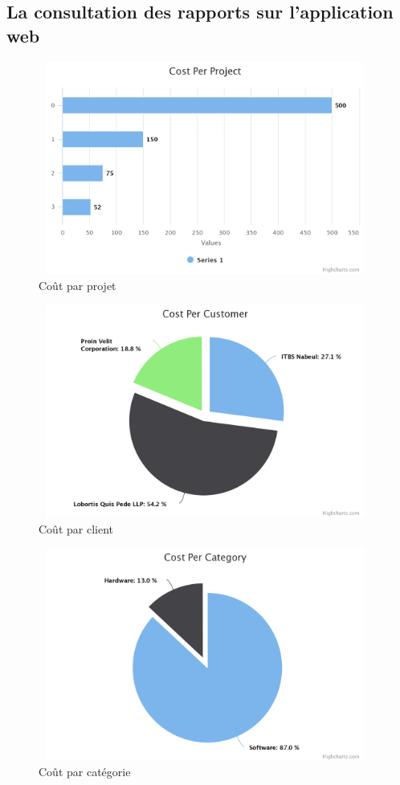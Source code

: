 \subsection{La consultation des rapports  sur l'application web}

\begin{figure}[H]
\center
\includegraphics[width=11cm,height=7cm]{./figures/pres/cost-per-project.png}
\caption{ Co\^{u}t par projet }
\end{figure}



\begin{figure}[H]
\center
\includegraphics[width=11cm,height=7cm]{./figures/pres/cost-per-customer.png}
\caption{ Co\^{u}t par client }
\end{figure}

\begin{figure}[H]
\center
\includegraphics[width=11cm,height=7cm]{./figures/pres/cost-per-category.png}
\caption{ Co\^{u}t par cat\'{e}gorie}
\end{figure}



